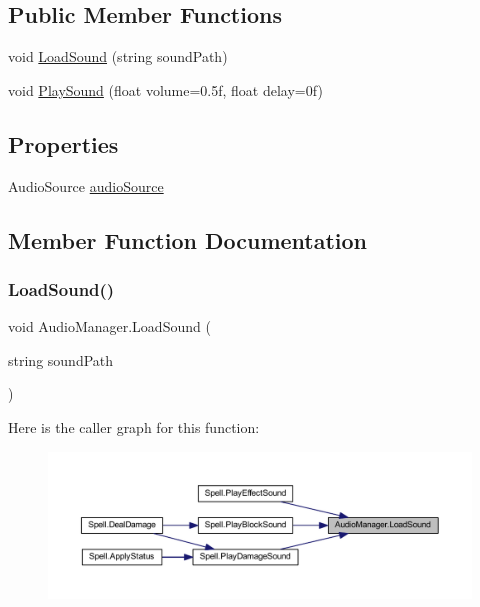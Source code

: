 \subsection*{Public Member Functions}
\begin{DoxyCompactItemize}
\item 
void \mbox{\hyperlink{class_audio_manager_a1520faf231d9b58d63a794f6b8040b99}{Load\+Sound}} (string sound\+Path)
\item 
void \mbox{\hyperlink{class_audio_manager_ac0f0dc189806848c224581b363b87396}{Play\+Sound}} (float volume=0.\+5f, float delay=0f)
\end{DoxyCompactItemize}
\subsection*{Properties}
\begin{DoxyCompactItemize}
\item 
Audio\+Source \mbox{\hyperlink{class_audio_manager_a0c2aea6ea779d69228564aca9476ea80}{audio\+Source}}
\end{DoxyCompactItemize}


\subsection{Member Function Documentation}
\mbox{\label{class_audio_manager_a1520faf231d9b58d63a794f6b8040b99}} 
\subsubsection{\texorpdfstring{LoadSound()}{LoadSound()}}
{\footnotesize\ttfamily void Audio\+Manager.\+Load\+Sound (\begin{DoxyParamCaption}\item[{string}]{sound\+Path }\end{DoxyParamCaption})}

Here is the caller graph for this function\+:\nopagebreak
\begin{figure}[H]
\begin{center}
\leavevmode
\includegraphics[width=350pt]{class_audio_manager_a1520faf231d9b58d63a794f6b8040b99_icgraph}
\end{center}
\end{figure}
\mbox{\label{class_audio_manager_ac0f0dc189806848c224581b363b87396}} 
